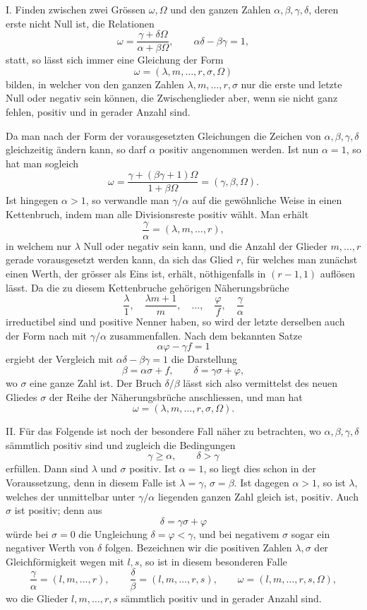 \documentclass[11pt]{article}
\begin{document}
I. Finden zwischen zwei Grössen $\omega,\Omega$ und den ganzen Zahlen $\alpha,\beta,\gamma,\delta$, deren erste nicht Null ist, die Relationen
\[
 \omega=\frac{\gamma+\delta\Omega}{\alpha+\beta\Omega},
 \qquad
 \alpha\delta-\beta\gamma=1,
\]
statt, so lässt sich immer eine Gleichung der Form
\[
  \omega=(\lambda,m,\ldots,r,\sigma,\Omega)
\]
bilden, in welcher von den ganzen Zahlen $\lambda,m,\ldots,r,\sigma$ nur die erste und letzte Null oder negativ sein können, die Zwischenglieder aber, wenn sie nicht ganz fehlen, positiv und in gerader Anzahl sind.

Da man nach der Form der vorausgesetzten Gleichungen die Zeichen von $\alpha,\beta,\gamma,\delta$ gleichzeitig ändern kann, so darf $\alpha$ positiv angenommen werden. Ist nun $\alpha=1$, so hat man sogleich
\[
 \omega=\frac{\gamma+(\beta\gamma+1)\Omega}{1+\beta\Omega}
       =(\gamma,\beta,\Omega).
\]
Ist hingegen $\alpha>1$, so verwandle man $\gamma/\alpha$ auf die gewöhnliche Weise in einen Kettenbruch, indem man alle Divisionsreste positiv wählt. Man erhält
\[
 \frac{\gamma}{\alpha}=(\lambda,m,\ldots,r),
\]
in welchem nur $\lambda$ Null oder negativ sein kann, und die Anzahl der Glieder $m,\ldots,r$ gerade vorausgesetzt werden kann, da sich das Glied $r$, für welches man zunächst einen Werth, der grösser als Eins ist, erhält, nöthigenfalls in $(r-1,1)$ auflösen lässt. Da die zu diesem Kettenbruche gehörigen Näherungsbrüche
\[
 \frac{\lambda}{1},\quad \frac{\lambda m+1}{m},\quad\ldots,\quad
 \frac{\varphi}{f},\quad \frac{\gamma}{\alpha}
\]
irreductibel sind und positive Nenner haben, so wird der letzte derselben auch der Form nach mit $\gamma/\alpha$ zusammenfallen. Nach dem bekannten Satze
\[
 \alpha\varphi-\gamma f=1
\]
ergiebt der Vergleich mit $\alpha\delta-\beta\gamma=1$ die Darstellung
\[
  \beta=\alpha\sigma+f,
  \qquad
  \delta=\gamma\sigma+\varphi,
\]
wo $\sigma$ eine ganze Zahl ist. Der Bruch $\delta/\beta$ lässt sich also vermittelst des neuen Gliedes $\sigma$ der Reihe der Näherungsbrüche anschliessen, und man hat
\[
  \omega=(\lambda,m,\ldots,r,\sigma,
\Omega).
\]

II. Für das Folgende ist noch der besondere Fall näher zu betrachten, wo $\alpha,\beta,\gamma,\delta$ sämmtlich positiv sind und zugleich die Bedingungen
\[
 \gamma\geq \alpha,
 \qquad
 \delta>\gamma
\]
erfüllen. Dann sind $\lambda$ und $\sigma$ positiv. Ist $\alpha=1$, so liegt dies schon in der Voraussetzung, denn in diesem Falle ist $\lambda=\gamma$, $\sigma=\beta$. Ist dagegen $\alpha>1$, so ist $\lambda$, welches der unmittelbar unter $\gamma/\alpha$ liegenden ganzen Zahl gleich ist, positiv. Auch $\sigma$ ist positiv; denn aus
\[
 \delta=\gamma\sigma+\varphi
\]
würde bei $\sigma=0$ die Ungleichung $\delta=\varphi<\gamma$, und bei negativem $\sigma$ sogar ein negativer Werth von $\delta$ folgen. Bezeichnen wir die positiven Zahlen $\lambda,\sigma$ der Gleichförmigkeit wegen mit $l,s$, so ist in diesem besonderen Falle
\[
 \frac{\gamma}{\alpha}=(l,m,\ldots,r),
 \qquad
 \frac{\delta}{\beta}=(l,m,\ldots,r,s),
 \qquad
 \omega=(l,m,\ldots,r,s,\Omega),
\]
wo die Glieder $l,m,\ldots,r,s$ sämmtlich positiv und in gerader Anzahl sind.
\end{document}
